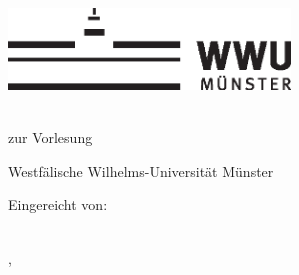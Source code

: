 \thispagestyle{empty}

\begin{center}
    \includegraphics[width=7.5cm]{logos/wwu-logo.eps}
    \par
    \vspace*{8ex}
    \LARGE
    \printtitle
    \par
    \normalsize
    \vspace*{8ex}
    \large
    \textsc{\printtype}\\
    \normalsize
    zur Vorlesung\\
    \large
    \textsc{\printdegree}
    \par
    \normalsize
    \vspace*{6ex}
    Westfälische Wilhelms-Universität Münster\\
    \printinstitute
\end{center}

%
%

\vspace*{5cm}
\par
\normalsize
\vspace*{2ex}
Eingereicht von:\\
\large
\textit{\printname}\\
\textit{\printgroup}

\par
\normalsize
\vspace*{4ex}
\printcity, \makeatletter
\monthname
\makeatother~\the\year
